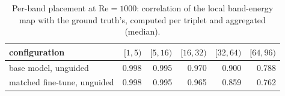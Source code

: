 \begin{table}[t]
  \centering
  \caption{Per-band placement at $\mathrm{Re}=1000$: correlation of the local band-energy map with the ground truth's, computed per triplet and aggregated (median).}
  \label{tab:re1000-perband-place}
  \begin{tabular}{lrrrrr}
    \toprule
    configuration & $[1,5)$ & $[5,16)$ & $[16,32)$ & $[32,64)$ & $[64,96)$ \\
    \midrule
    base model, unguided & 0.998 & 0.995 & 0.970 & 0.900 & 0.788 \\
    matched fine-tune, unguided & 0.998 & 0.995 & 0.965 & 0.859 & 0.762 \\
    \bottomrule
  \end{tabular}
\end{table}
